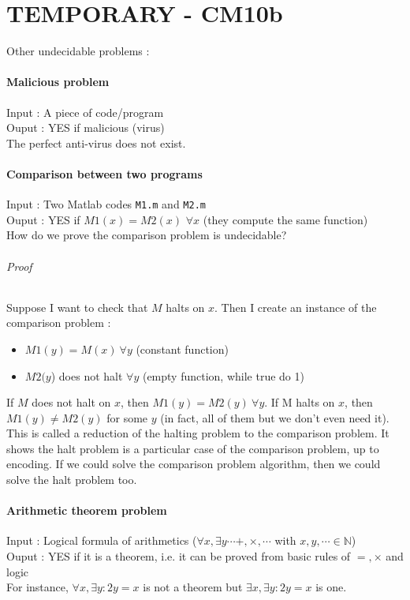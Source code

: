 \part*{TEMPORARY - CM10b}

Other undecidable problems :
\subsection{Malicious problem}
Input : A piece of code/program\\
Ouput : YES if malicious (virus)\\
The perfect anti-virus does not exist.

\subsection{Comparison between two programs}
Input : Two Matlab codes \texttt{M1.m} and \texttt{M2.m}\\
Ouput : YES if $M1(x) = M2(x)$ $\forall x$ (they compute the same function)\\
How do we prove the comparison problem is undecidable?
\paragraph{Proof} Suppose I want to check that $M$ halts on $x$. Then I create an instance of the comparison problem : 
\begin{itemize}
\item $M1(y) = M(x) \ \forall y$ (constant function)
\item $M2(y$) does not halt $\forall y$ (empty function, while true do 1)
\end{itemize}
If $M$ does not halt on $x$, then $M1(y) = M2(y) \ \forall y$. If M halts on $x$, then  $M1(y) \neq M2(y)$ for some $y$ (in fact, all of them but we don't even need it).
This is called a reduction of the halting problem to the comparison problem. It shows the halt problem is a particular case of the comparison problem, up to encoding. If we could solve the comparison problem algorithm, then we could solve the halt problem too.

\subsection{Arithmetic theorem problem}
Input : Logical formula of arithmetics ($\forall x, \exists y \cdots +, \times, \cdots$ with $x,y,\cdots \in \mathbb{N}$)\\
Ouput : YES if it is a theorem, i.e. it can be proved from basic rules of $=,\times$ and logic\\
For instance, $\forall x, \exists y : 2y = x$ is not a theorem but  $\exists x, \exists y : 2y = x$ is one.\\

